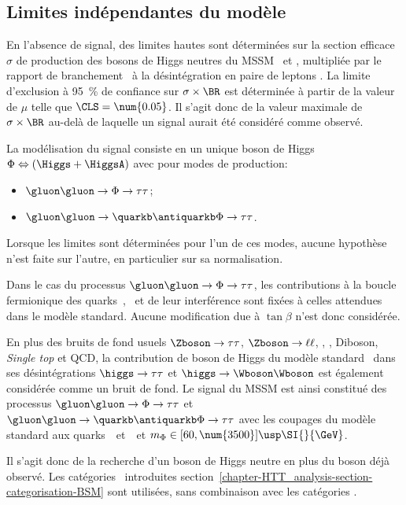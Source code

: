 \subsection{Limites indépendantes du modèle}\label{chapter-HTT_analysis-section-signal_extraction-model_indep_and_likelihood}
En l'absence de signal, des limites hautes sont déterminées sur la section efficace $\sigma$ de production des bosons de Higgs neutres du MSSM \Higgs\ et \HiggsA, multipliée par le rapport de branchement \BR\ à la désintégration en paire de leptons \tau.
La limite d'exclusion à \SI{95}{\%} de confiance sur $\sigma\times\BR$ est déterminée à partir de la valeur de $\mu$ telle que $\CLS = \num{0.05}$.
Il s'agit donc de la valeur maximale de $\sigma\times\BR$ au-delà de laquelle un signal aurait été considéré comme observé.
\par
La modélisation du signal consiste en un unique boson de Higgs $\Phi \Leftrightarrow (\Higgs + \HiggsA)$ avec pour modes de production:
\begin{itemize}
\item $\gluon\gluon\to\Phi\to\tau\tau$;
\item $\gluon\gluon\to\quarkb\antiquarkb\Phi\to\tau\tau$.
\end{itemize}
Lorsque les limites sont déterminées pour l'un de ces modes, aucune hypothèse n'est faite sur l'autre, en particulier sur sa normalisation.
\par
Dans le cas du processus $\gluon\gluon\to\Phi\to\tau\tau$, les contributions à la boucle fermionique des quarks~\quarkt, \quarkb\ et de leur interférence sont fixées à celles attendues dans le modèle standard.
Aucune modification due à $\tan\beta$ n'est donc considérée.
\par
En plus des bruits de fond usuels
$\Zboson\to\tau\tau$,
$\Zboson\to\ell\ell$,
\Wjets,
\ttbar,
Diboson, \emph{Single top}
et
QCD,
la contribution de boson de Higgs du modèle standard \higgs\ dans ses désintégrations
$\higgs\to\tau\tau$
et
$\higgs\to\Wboson\Wboson$
est également considérée comme un bruit de fond.
Le signal du MSSM est ainsi constitué des processus
$\gluon\gluon\to\Phi\to\tau\tau$
et
$\gluon\gluon\to\quarkb\antiquarkb\Phi\to\tau\tau$
avec les coupages du modèle standard aux quarks~\quarkt\ et~\quarkb\
et $m_\Phi\in[60, \num{3500}]\usp\SI{}{\GeV}$.
\par
Il s'agit donc de la recherche d'un boson de Higgs neutre en plus du boson déjà observé.
Les catégories \CATbsm\ introduites section~\ref{chapter-HTT_analysis-section-categorisation-BSM} sont utilisées, sans combinaison avec les catégories \CATsm.